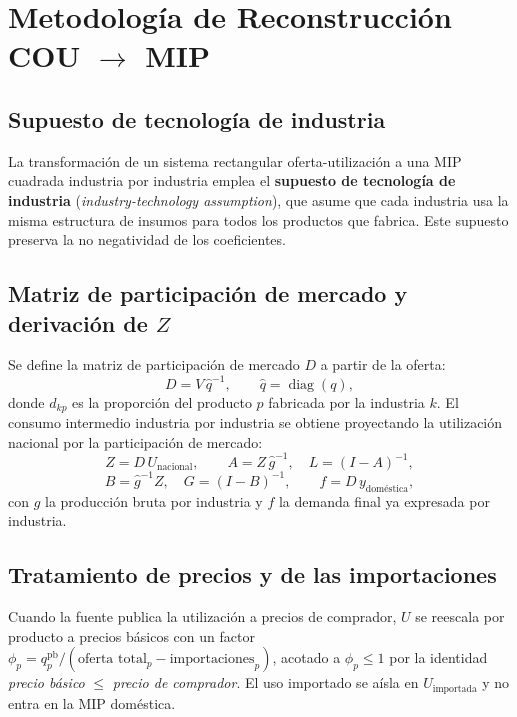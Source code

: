 \documentclass[11pt,a4paper]{article}
\newcommand{\diag}{\operatorname{diag}}
\begin{document}
\section{Metodología de Reconstrucción COU \texorpdfstring{$\to$}{->} MIP}
\label{sec:reconstruccion}

\subsection{Supuesto de tecnología de industria}
La transformación de un sistema rectangular oferta-utilización a una MIP
cuadrada industria por industria emplea el \textbf{supuesto de tecnología de
industria} (\emph{industry-technology assumption}), que asume que cada industria
usa la misma estructura de insumos para todos los productos que fabrica. Este
supuesto preserva la no negatividad de los coeficientes.

\subsection{Matriz de participación de mercado y derivación de \texorpdfstring{$Z$}{Z}}
Se define la matriz de participación de mercado $D$ a partir de la oferta:
\begin{equation}
D = V\,\hat{q}^{-1}, \qquad \hat{q}=\diag(q),
\end{equation}
donde $d_{kp}$ es la proporción del producto $p$ fabricada por la industria $k$.
El consumo intermedio industria por industria se obtiene proyectando la
utilización nacional por la participación de mercado:
\begin{equation}
Z = D\,U_{\text{nacional}}, \qquad
A = Z\,\hat{g}^{-1},\quad L=(I-A)^{-1},
\end{equation}
\begin{equation}
B=\hat{g}^{-1}Z,\quad G=(I-B)^{-1},\qquad
f = D\,y_{\text{doméstica}},
\end{equation}
con $g$ la producción bruta por industria y $f$ la demanda final ya expresada por
industria.

\subsection{Tratamiento de precios y de las importaciones}
Cuando la fuente publica la utilización a precios de comprador, $U$ se reescala
por producto a precios básicos con un factor
$\phi_p = q^{\text{pb}}_p / (\text{oferta total}_p - \text{importaciones}_p)$,
acotado a $\phi_p\le 1$ por la identidad \emph{precio básico} $\le$ \emph{precio
de comprador}. El uso importado se aísla en $U_{\text{importada}}$ y no entra en
la MIP doméstica.
\end{document}
